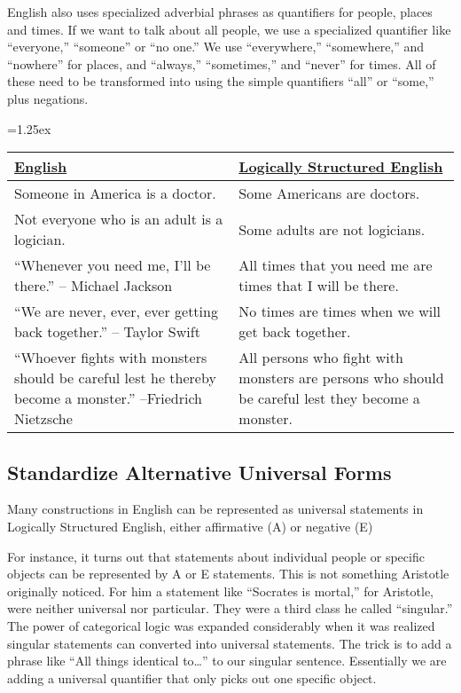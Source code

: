 English also uses specialized adverbial phrases as quantifiers for people, places and times. If we want to talk about all people, we use a specialized quantifier like ``everyone,'' ``someone'' or ``no one.'' We use ``everywhere,'' ``somewhere,'' and ``nowhere'' for places, and ``always,'' ``sometimes,'' and ``never'' for times.  All of these need to be transformed into using the simple quantifiers ``all'' or ``some,'' plus negations.

\begin{fullwidth}
\tabulinesep=1.25ex
\begin{longtabu}{p{.5\linewidth}p{.5\linewidth}}
\underline{English} &
\underline{Logically Structured English} \\
\endhead
Someone in America is a doctor. &
Some Americans are doctors. \\

Not everyone who is an adult is a logician. &
Some adults are not logicians. \\

``Whenever you need me, I'll be there.'' -- Michael Jackson &
All times that you need me are times that I will be there. \\

``We are never, ever, ever getting back together.'' -- Taylor Swift &
No times are times when we will get back together.\\

``Whoever fights with monsters should be careful lest he thereby become a monster.'' --Friedrich Nietzsche &
All persons who fight with monsters are persons who should be careful lest they become a monster.\\

\end{longtabu}
\end{fullwidth}

\subsection{Standardize Alternative Universal Forms}
\label{subsec:alternative_universals}

Many constructions in English can be represented as universal statements in Logically Structured English, either affirmative (A) or negative (E)

For instance, it turns out that statements about individual people or specific objects can be represented by A or E statements. This is not something Aristotle originally noticed. For him a statement like ``Socrates is mortal,'' for Aristotle, were neither universal nor particular. They were a third class he called ``singular.'' The power of categorical logic was expanded considerably when it was realized singular statements can converted into universal statements. The trick is to add a phrase like ``All things identical to\ldots'' to our singular sentence. Essentially we are adding a universal quantifier that only picks out one specific object.

